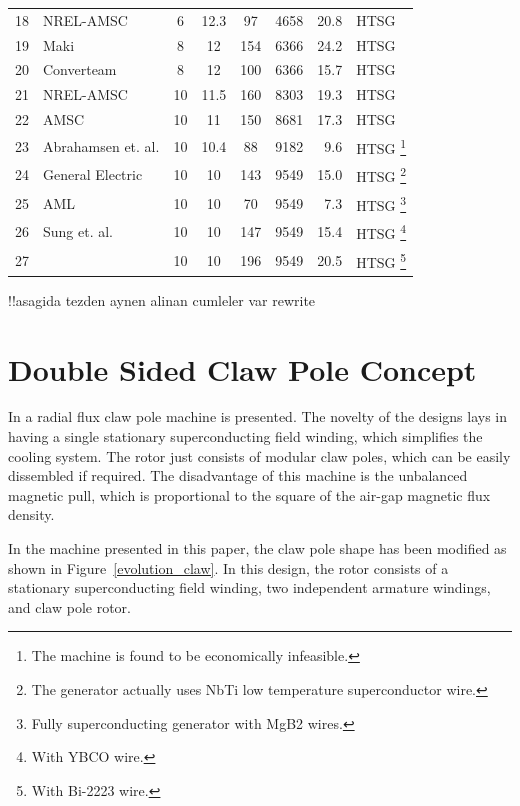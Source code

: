\documentclass[12pt]{iopart}
\begin{document}
\begin{table}[]
\begin{minipage}{\textwidth}
\begin{tabular}{llcccrrl}
18 & NREL-AMSC \cite{Maples2010}  & 6 & 12.3 & 97 & 4658 & 20.8 & HTSG  \\
19 & Maki \cite{Maki2008}  & 8 & 12 & 154 & 6366 & 24.2 & HTSG  \\
20 & Converteam \cite{Lewis2007} & 8 & 12 & 100 & 6366 & 15.7 & HTSG  \\
21 & NREL-AMSC \cite{Maples2010} & 10 & 11.5 & 160 & 8303 & 19.3 & HTSG  \\
22 & AMSC \cite{Snitchler2010} & 10 & 11 & 150 & 8681 & 17.3 & HTSG  \\
23 & Abrahamsen et. al. \cite{Abrahamsen2010}& 10 & 10.4 & 88 & 9182 & 9.6 & HTSG \footnote{The machine is found to be economically infeasible.} \\
24 & General Electric \cite{Fair2012} & 10 & 10 & 143 & 9549 & 15.0 & HTSG \footnote{The generator actually uses NbTi low temperature superconductor wire.} \\
25 & AML \cite{Masson2011} & 10 & 10 & 70 & 9549 & 7.3 & HTSG \footnote{Fully superconducting generator with MgB2 wires.} \\
26 & Sung et. al. \cite{Sung2013} & 10 & 10 & 147 & 9549 & 15.4 & HTSG \footnote{With YBCO wire.} \\
27 & & 10 & 10 & 196 & 9549 & 20.5 & HTSG \footnote{With Bi-2223 wire.} \\
\hline
\end{tabular}
\end{minipage}
\end{table}

!!asagida tezden aynen alinan cumleler var rewrite

\section{Double Sided Claw Pole Concept}

In \cite{} a radial flux claw pole machine is presented. The novelty of the designs lays in having a single stationary superconducting field winding, which simplifies the cooling system. The rotor just consists of modular claw poles, which can be easily dissembled if required. The disadvantage of this machine is the unbalanced magnetic pull, which is proportional to the square of the air-gap magnetic flux density.

In the machine presented in this paper, the claw pole shape has been modified as shown in Figure~\ref{evolution_claw}. In this design, the rotor consists of a stationary superconducting field winding, two independent armature windings, and claw pole rotor.
\end{document}
